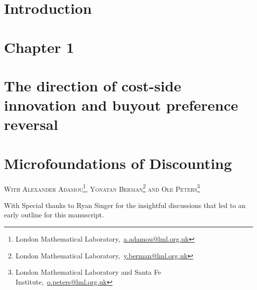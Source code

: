 \documentclass[12pt,twoside]{report}
\makeatletter
\numberwithin{equation}{section}
\newcommand{\chapterauthor}[1]{%
  {\parindent0pt\vspace*{-25pt}%
  \linespread{1.1}\large\scshape#1%
  \par\nobreak\vspace*{35pt}}
  \@afterheading%
}
\makeatother
\begin{document}
\chapter{Introduction}

%
\chapter{Chapter 1}


\chapter{The direction of cost-side innovation and buyout preference reversal}


\chapter{Microfoundations of Discounting}
\chapterauthor{With Alexander Adamou\footnote{London Mathematical Laboratory,~\url{a.adamou@lml.org.uk}}, Yonatan Berman\footnote{London Mathematical Laboratory,~\url{y.berman@lml.org.uk}} and Ole Peters\footnote{London Mathematical Laboratory and Santa Fe Institute,~\url{o.peters@lml.org.uk}}}
With Special thanks to Ryan Singer for the insightful discussions that led to an early outline for this manuscript.


\end{document}
